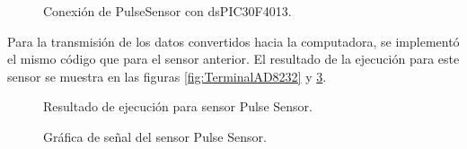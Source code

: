 	\begin{figure}[htbp!]
		\centering
		\caption{Conexión de PulseSensor con dsPIC30F4013.}
		\label{fig:ConexionPulseSensor}
	\end{figure}

Para la transmisión de los datos convertidos hacia la computadora, se implementó el mismo código que para el sensor anterior. El resultado de la ejecución para este sensor se muestra en las figuras \ref{fig:TerminalAD8232} y \ref{fig:GraficaPulseSensor}.
	
	\begin{figure}[htbp!]
		\centering
		\caption{Resultado de ejecución para sensor Pulse Sensor.}
		\label{fig:TerminalPulseSensor}
	\end{figure}
	
	\begin{figure}[htbp!]
		\centering
		\caption{Gráfica de señal del sensor Pulse Sensor.}
		\label{fig:GraficaPulseSensor}
	\end{figure}
	
	\clearpage